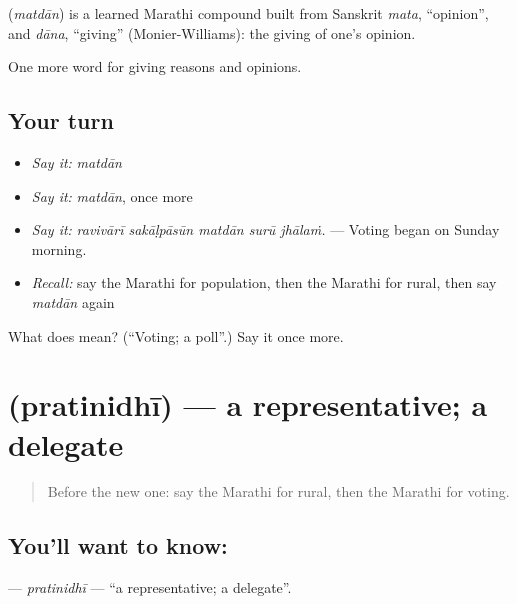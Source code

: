 \begin{cousinweb}
\textbf{} (\emph{matdān}) is a learned Marathi compound built from Sanskrit \emph{mata}, \textquotedblleft{}opinion\textquotedblright{}, and \emph{dāna}, \textquotedblleft{}giving\textquotedblright{} (Monier-Williams): the giving of one's opinion.
\end{cousinweb}

\begin{grammarlens}[title={What you've built}]
One more word for giving reasons and opinions.
\end{grammarlens}

\subsection*{Your turn}
\begin{itemize}
\raggedright
  \item \emph{Say it:} \emph{matdān}
  \item \emph{Say it:} \emph{matdān}, once more
  \item \emph{Say it:} \emph{ravivārī sakāḷpāsūn matdān surū jhālaṁ.} — Voting began on Sunday morning.
  \item \emph{Recall:} say the Marathi for population, then the Marathi for rural, then say \emph{matdān} again
\end{itemize}

\begin{tcolorbox}[breakable,colback=teal!4,colframe=teal!35!black,title={Before you move on}]
What does  mean? (\textquotedblleft{}Voting; a poll\textquotedblright{}.) Say it once more.
\end{tcolorbox}
\section[\texorpdfstring{\mr{प्रतिनिधी} (pratinidhī)}{प्रतिनिधी (pratinidhī)}]{ (pratinidhī) — a representative; a delegate}

\label{lesson:MR-C355-pratinidhi}



\begin{quote}
Before the new one: say the Marathi for rural, then the Marathi for voting.
\end{quote}

\subsection*{You'll want to know: }
\textbf{} — \emph{pratinidhī} — \textquotedblleft{}a representative; a delegate\textquotedblright{}.

